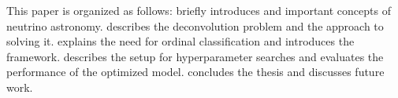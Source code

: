 This paper is organized as follows:
 briefly introduces \icecube{} and important concepts of neutrino astronomy.
 describes the deconvolution problem and the \dsea{} approach to solving it.
 explains the need for ordinal classification and introduces the \corn{} framework.
 describes the setup for hyperparameter searches and evaluates the performance of the optimized model.
 concludes the thesis and discusses future work.
